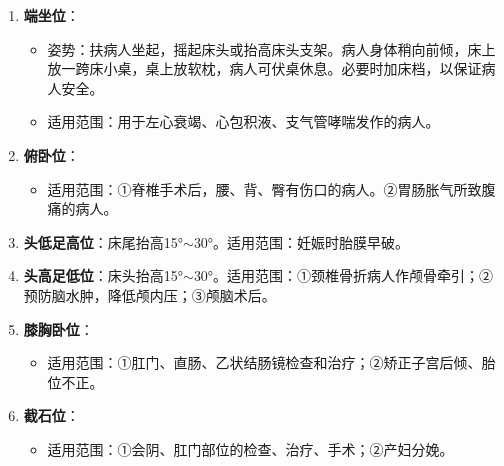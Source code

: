 \documentclass[11pt, a4paper]{ctexart}
\begin{document}
\begin{enumerate}
\begin{itemize}
		      \item 适用范围：①面、颈部手术后病人（预防术后局部出血）。②胸腔疾病、胸部创伤、心肺疾患引起的呼吸困难患者。减少腹腔脏器对心肺的压力，增加肺活量，减轻肺淤血和心脏负担，促进呼吸。同时，有利于引流脓液、血液等。③盆腹腔术后或炎症患者。④促进引流；⑤使感染局限盆腔，减少炎症的扩散和毒素的吸收；⑥防止膈下脓肿的形成；⑦减轻腹部切口缝合处的张力，减轻疼痛，利于愈合。④疾病恢复期体弱患者。
	      \end{itemize}
	\item \textbf{端坐位}：
	      \begin{itemize}
		      \item 姿势：扶病人坐起，摇起床头或抬高床头支架。病人身体稍向前倾，床上放一跨床小桌，桌上放软枕，病人可伏桌休息。必要时加床档，以保证病人安全。
		      \item 适用范围：用于左心衰竭、心包积液、支气管哮喘发作的病人。
	      \end{itemize}
	\item \textbf{俯卧位}：
	      \begin{itemize}
		      \item 适用范围：①脊椎手术后，腰、背、臀有伤口的病人。②胃肠胀气所致腹痛的病人。
	      \end{itemize}
	\item \textbf{头低足高位}：床尾抬高15°$\sim$30°。适用范围：妊娠时胎膜早破。
	\item \textbf{头高足低位}：床头抬高15°$\sim$30°。适用范围：①颈椎骨折病人作颅骨牵引；②预防脑水肿，降低颅内压；③颅脑术后。
	\item \textbf{膝胸卧位}：
	      \begin{itemize}
		      \item 适用范围：①肛门、直肠、乙状结肠镜检查和治疗；②矫正子宫后倾、胎位不正。
	      \end{itemize}
	\item \textbf{截石位}：
	      \begin{itemize}
		      \item 适用范围：①会阴、肛门部位的检查、治疗、手术；②产妇分娩。
	      \end{itemize}
\end{enumerate}
\end{document}
